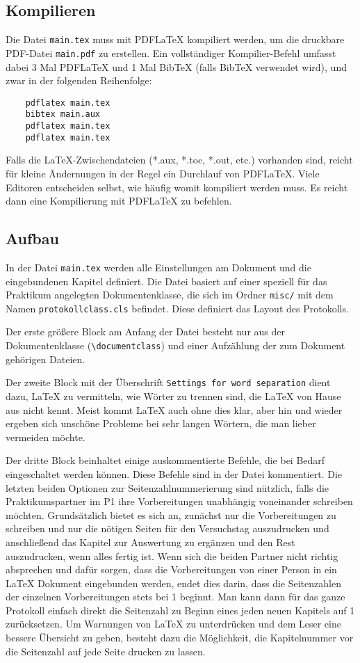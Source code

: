 \subsection{Kompilieren}
Die Datei \verb|main.tex| muss mit PDFLaTeX kompiliert werden, um die druckbare PDF-Datei \verb|main.pdf| zu erstellen. Ein vollständiger Kompilier-Befehl umfasst dabei 3 Mal PDFLaTeX und 1 Mal BibTeX (falls BibTeX verwendet wird), und zwar in der folgenden Reihenfolge:

\begin{verbatim}
	pdflatex main.tex
	bibtex main.aux
	pdflatex main.tex
	pdflatex main.tex
\end{verbatim}

Falls die LaTeX-Zwischendateien (*.aux, *.toc, *.out, etc.) vorhanden sind, reicht für kleine Ändernungen in der Regel ein Durchlauf von PDFLaTeX. Viele Editoren entscheiden selbst, wie häufig womit kompiliert werden muss. Es reicht dann eine Kompilierung mit PDFLaTeX zu befehlen.

\subsection{Aufbau}
In der Datei \verb|main.tex| werden alle Einstellungen am Dokument und die eingebundenen Kapitel definiert. Die Datei basiert auf einer speziell für das Praktikum angelegten Dokumentenklasse, die sich im Ordner \verb|misc/| mit dem Namen \verb|protokollclass.cls| befindet. Diese definiert das Layout des Protokolls.

Der erste größere Block am Anfang der Datei besteht nur aus der Dokumentenklasse (\verb|\documentclass|) und einer Aufzählung der zum Dokument gehörigen Dateien.

Der zweite Block mit der Überschrift \verb|Settings for word separation| dient dazu, LaTeX zu vermitteln, wie Wörter zu trennen sind, die LaTeX von Hause aus nicht kennt. Meist kommt LaTeX auch ohne dies klar, aber hin und wieder ergeben sich unschöne Probleme bei sehr langen Wörtern, die man lieber vermeiden möchte.

Der dritte Block beinhaltet einige auskommentierte Befehle, die bei Bedarf eingeschaltet werden können. Diese Befehle sind in der Datei kommentiert. Die letzten beiden Optionen zur Seitenzahlnummerierung sind nützlich, falls die Praktikumspartner im P1 ihre Vorbereitungen unabhängig voneinander schreiben möchten. Grundsätzlich bietet es sich an, zunächst nur die Vorbereitungen zu schreiben und nur die nötigen Seiten für den Versuchstag auszudrucken und anschließend das Kapitel zur Auswertung zu ergänzen und den Rest auszudrucken, wenn alles fertig ist. Wenn sich die beiden Partner nicht richtig absprechen und dafür sorgen, dass die Vorbereitungen von einer Person in ein LaTeX Dokument eingebunden werden, endet dies darin, dass die Seitenzahlen der einzelnen Vorbereitungen stets bei 1 beginnt. Man kann dann für das ganze Protokoll einfach direkt die Seitenzahl zu Beginn eines jeden neuen Kapitels auf 1 zurücksetzen. Um Warnungen von LaTeX zu unterdrücken und dem Leser eine bessere Übersicht zu geben, besteht dazu die Möglichkeit, die Kapitelnummer vor die Seitenzahl auf jede Seite drucken zu lassen.

